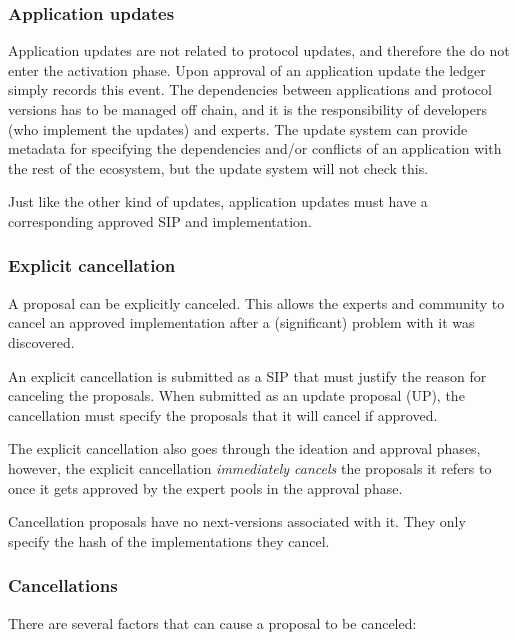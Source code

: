 \subsubsection{Application updates}
\label{sec:software-only-updates}

Application updates are not related to protocol updates, and therefore the do
not enter the activation phase.
%
Upon approval of an application update the ledger simply records this event.
%
The dependencies between applications and protocol versions has to be managed
off chain, and it is the responsibility of developers (who implement the
updates) and experts. The update system can provide metadata for specifying the
dependencies and/or conflicts of an application with the rest of the ecosystem,
but the update system will not check this.

Just like the other kind of updates, application updates must have a
corresponding approved SIP and implementation.

\subsubsection{Explicit cancellation}
\label{sec:explicit-cancellation}

A proposal can be explicitly canceled. This allows the experts and community to
cancel an approved implementation after a (significant) problem with it was
discovered.

An explicit cancellation is submitted as a SIP that must justify the reason for
canceling the proposals. When submitted as an update proposal (UP), the
cancellation must specify the proposals that it will cancel if approved.

The explicit cancellation also goes through the ideation and approval phases,
however, the explicit cancellation \emph{immediately cancels} the proposals it
refers to once it gets approved by the expert pools in the approval phase.

Cancellation proposals have no next-versions associated with it. They only
specify the hash of the implementations they cancel.

\subsubsection{Cancellations}
\label{sec:cancellations}

There are several factors that can cause a proposal to be canceled:


